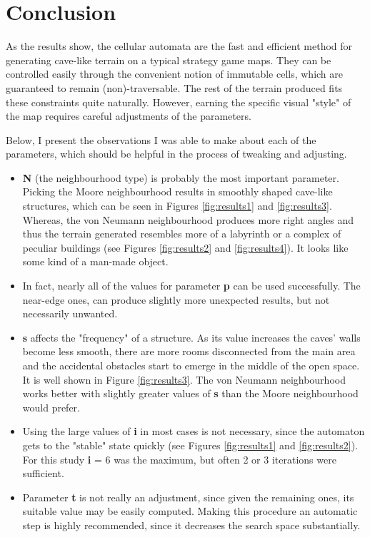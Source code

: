 \documentclass[a4paper, 11pt]{article} %
\begin{document}

\section*{Conclusion}

As the results show, the cellular automata are the fast and efficient method for generating cave-like terrain on a typical strategy game maps. They can be controlled easily through the convenient notion of immutable cells, which are guaranteed to remain (non)-traversable. The rest of the terrain produced fits these constraints quite naturally. However, earning the specific visual "style" of the map requires careful adjustments of the parameters.

Below, I present the observations I was able to make about each of the parameters, which should be helpful in the process of tweaking and adjusting.

\begin{itemize}
        \item \textbf{N} (the neighbourhood type) is probably the most important parameter. Picking the Moore neighbourhood results in smoothly shaped cave-like structures, which can be seen in Figures \ref{fig:results1} and \ref{fig:results3}. Whereas, the von Neumann neighbourhood produces more right angles and thus the terrain generated resembles more of a labyrinth or a complex of peculiar buildings (see Figures \ref{fig:results2} and \ref{fig:results4}). It looks like some kind of a man-made object. 
	\item In fact, nearly all of the values for parameter \textbf{p} can be used successfully. The near-edge ones, can produce slightly more unexpected results, but not necessarily unwanted.
	\item \textbf{s} affects the "frequency" of a structure. As its value increases the caves' walls become less smooth, there are more rooms disconnected from the main area and the accidental obstacles start to emerge in the middle of the open space. It is well shown in Figure \ref{fig:results3}. The von Neumann neighbourhood works better with slightly greater values of \textbf{s} than the Moore neighbourhood would prefer.
	\item Using the large values of \textbf{i} in most cases is not necessary, since the automaton gets to the "stable" state quickly (see Figures \ref{fig:results1} and \ref{fig:results2}). For this study \textbf{i} = 6 was the maximum, but often 2 or 3 iterations were sufficient.
        \item Parameter \textbf{t} is not really an adjustment, since given the remaining ones, its suitable value may be easily computed. Making this procedure an automatic step is highly recommended, since it decreases the search space substantially.
\end{itemize}
\end{document}

